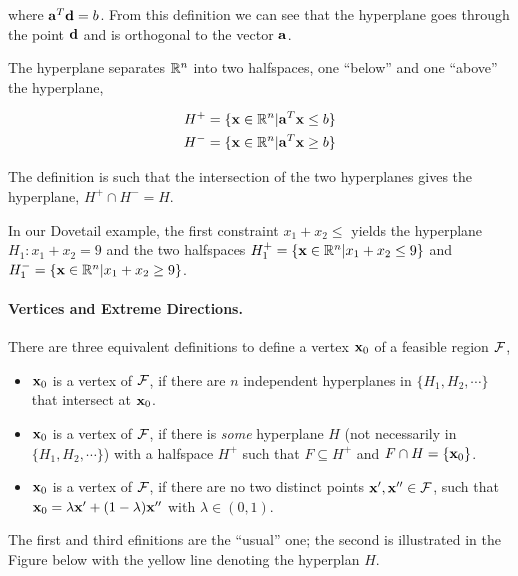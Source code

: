 where $\mathbf{a}^T \mathbf{d} = b$. From this definition we can see that the hyperplane goes through the point $\mathbf{d}$ and is orthogonal to the vector $\mathbf{a}$.

The hyperplane separates $\mathbb{R}^n$ into two halfspaces, one ``below'' and one ``above'' the hyperplane,

\begin{align*}
  H^+ &= \{ \mathbf{x} \in \mathbb{R}^n | \mathbf{a}^T \mathbf{x} \leq b\} \\
  H^- &= \{ \mathbf{x} \in \mathbb{R}^n | \mathbf{a}^T \mathbf{x} \geq b\}
\end{align*}

The definition is such that the intersection of the two hyperplanes gives the hyperplane, $H^+ \cap H^- = H$.

In our Dovetail example, the first constraint $x_1 + x_2 \leq$ yields the hyperplane $H_1: x_1 + x_2 = 9$ and the two halfspaces $H_1^+ =  \{ \mathbf{x} \in \mathbb{R}^n | x_1 + x_2 \leq 9 \}$ and $H_1^- =  \{ \mathbf{x} \in \mathbb{R}^n | x_1 + x_2 \geq 9 \}$.

\paragraph{Vertices and Extreme Directions.} There are three equivalent definitions to define a vertex $\mathbf{x}_0$ of a feasible region $\mathcal{F}$,

\begin{itemize}
  \item $\mathbf{x}_0$ is a vertex of $\mathcal{F}$, if there are $n$ independent hyperplanes in $\{H_1, H_2, \cdots\}$ that intersect at $\mathbf{x}_0$.

  \item $\mathbf{x}_0$ is a vertex of $\mathcal{F}$, if there is \emph{some} hyperplane $H$ (not necessarily in $\{H_1, H_2, \cdots\}$) with a halfspace $H^+$ such that $F \subseteq H^+$ and $F \cap H = \{ \mathbf{x}_0 \}$.

  \item $\mathbf{x}_0$ is a vertex of $\mathcal{F}$, if there are no two distinct points $\mathbf{x}', \mathbf{x}'' \in \mathcal{F}$, such that $\mathbf{x}_0 = \lambda \mathbf{x}' + (1-\lambda) \mathbf{x}''$ with $\lambda \in (0,1)$.

\end{itemize}

The first and third efinitions are the ``usual'' one; the second is illustrated in the Figure below with the yellow line denoting the hyperplan $H$.


